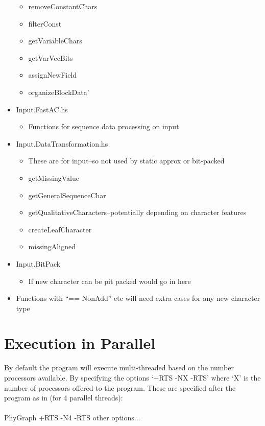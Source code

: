 \documentclass[11pt]{article}
\begin{document}
\begin{itemize}
			 \begin{itemize}
			 	\item{removeConstantChars}
			 	\item{filterConst}
			 	\item{getVariableChars}
			 	\item{getVarVecBits}
			 	\item{assignNewField}
			 	\item{organizeBlockData'}
			 \end{itemize}
		 	  \item{Input.FastAC.hs}
		 	 \begin{itemize}
		 	 	\item{Functions for sequence data processing on input}
		 	 \end{itemize}
		 	 \item{Input.DataTransformation.hs}
		 	 \begin{itemize}
		 	 	\item{These are for input--so not used by static approx or bit-packed}
		 	 	\item{getMissingValue}
		 	 	\item{getGeneralSequenceChar}
		 	 	\item{getQualitativeCharacters--potentially depending on character features}
		 	 	\item{createLeafCharacter}
		 	 	\item{missingAligned}
		 	 \end{itemize}
	 	 	 \item{Input.BitPack}
	 	 	 \begin{itemize}
	 	 	 	\item{If new character can be pit packed would go in here}
	 	 	 \end{itemize}
		 	 
			 \item{Functions with ``== NonAdd'' etc will need extra cases for any new character type}
	\end{itemize}
	\section{Execution in Parallel}
	By default the program will execute multi-threaded based on the number processors available.  By specifying the options `+RTS -NX -RTS' where `X' is the number of processors offered to the program. These are specified after the program as in (for 4 parallel threads):\\
	\\
	PhyGraph +RTS -N4 -RTS other options...  \\
	
\end{document}
